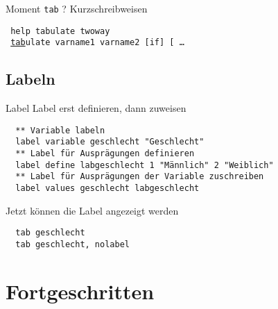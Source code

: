 \begin{frame}[fragile]{Moment \texttt{tab} ?}
Kurzschreibweisen\\ \vspace{0.5cm}  
\begin{scriptsize}
\texttt{
  \textcolor{Statakeywords}{help tabulate twoway} \\
  ~\underline{tab}ulate \textcolor{Statakeywords}{varname1} \textcolor{Statakeywords}{varname2} [\textcolor{Statakeywords}{if}] [ \dots
} \vspace{0.5cm}
\end{scriptsize}

\end{frame}

\subsection{Labeln}
\begin{frame}[fragile]{Label}     
Label erst definieren, dann zuweisen
\begin{lstlisting}
  ** Variable labeln
  label variable geschlecht "Geschlecht"
  ** Label für Ausprägungen definieren
  label define labgeschlecht 1 "Männlich" 2 "Weiblich"
  ** Label für Ausprägungen der Variable zuschreiben
  label values geschlecht labgeschlecht 
\end{lstlisting}
Jetzt können die Label angezeigt werden
\begin{lstlisting}
  tab geschlecht
  tab geschlecht, nolabel
\end{lstlisting}
\end{frame}

\section{Fortgeschritten}

